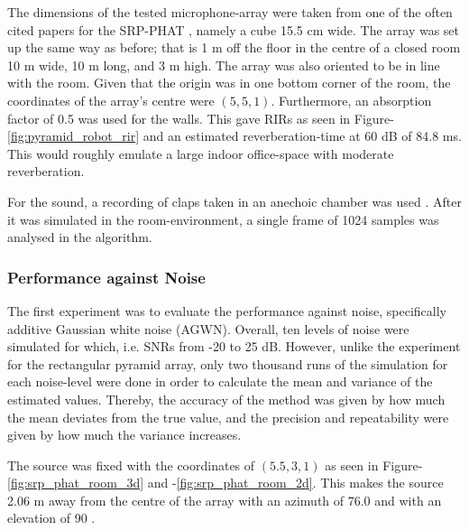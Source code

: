 \documentclass{report}
\begin{document}
The dimensions of the tested microphone-array were taken from one of the often cited papers for the SRP-PHAT \cite{valin_robust_2007}, namely a cube 15.5 \si{cm} wide. The array was set up the same way as before; that is 1 \si{m} off the floor in the centre of a closed room 10 \si{m} wide, 10 \si{m} long, and 3 \si{m} high. The array was also oriented to be in line with the room. Given that the origin was in one bottom corner of the room, the coordinates of the array's centre were $(5,5,1)$. Furthermore, an absorption factor of 0.5 was used for the walls. This gave RIRs as seen in Figure-\ref{fig:pyramid_robot_rir} and an estimated reverberation-time at 60 \si{dB} of 84.8 \si{ms}. This would roughly emulate a large indoor office-space with moderate reverberation.

For the sound, a recording of claps taken in an anechoic chamber was used \cite{noauthor_handclaps_2005}. After it was simulated in the room-environment, a single frame of 1024 samples was analysed in the algorithm.

\subsubsection{Performance against Noise}

The first experiment was to evaluate the performance against noise, specifically additive Gaussian white noise (AGWN). Overall, ten levels of noise were simulated for which, i.e. SNRs from -20 to 25 \si{dB}. However, unlike the experiment for the rectangular pyramid array, only two thousand runs of the simulation for each noise-level were done in order to calculate the mean and variance of the estimated values. Thereby, the accuracy of the method was given by how much the mean deviates from the true value, and the precision and repeatability were given by how much the variance increases.

The source was fixed with the coordinates of $(5.5,3,1)$  as seen in Figure-\ref{fig:srp_phat_room_3d} and -\ref{fig:srp_phat_room_2d}. This makes the source 2.06 \si{m} away from the centre of the array with an azimuth of 76.0 \si{\deg} and with an elevation of 90 \si{\deg}.
\end{document}
